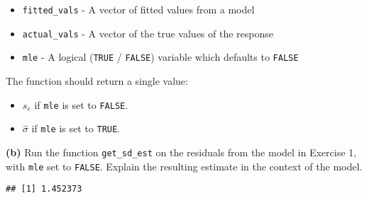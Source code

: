 \documentclass[]{article}
\newenvironment{Shaded}{\begin{snugshade}}{\end{snugshade}}
\newcommand{\ControlFlowTok}[1]{\textcolor[rgb]{0.13,0.29,0.53}{\textbf{#1}}}
\newcommand{\DataTypeTok}[1]{\textcolor[rgb]{0.13,0.29,0.53}{#1}}
\newcommand{\KeywordTok}[1]{\textcolor[rgb]{0.13,0.29,0.53}{\textbf{#1}}}
\newcommand{\NormalTok}[1]{#1}
\newcommand{\OperatorTok}[1]{\textcolor[rgb]{0.81,0.36,0.00}{\textbf{#1}}}
\newcommand{\OtherTok}[1]{\textcolor[rgb]{0.56,0.35,0.01}{#1}}
\newcommand{\StringTok}[1]{\textcolor[rgb]{0.31,0.60,0.02}{#1}}
\providecommand{\tightlist}{%
  \setlength{\itemsep}{0pt}\setlength{\parskip}{0pt}}
\begin{document}
\begin{itemize}
\tightlist
\item
  \texttt{fitted\_vals} - A vector of fitted values from a model
\item
  \texttt{actual\_vals} - A vector of the true values of the response
\item
  \texttt{mle} - A logical (\texttt{TRUE} / \texttt{FALSE}) variable
  which defaults to \texttt{FALSE}
\end{itemize}

The function should return a single value:

\begin{itemize}
\tightlist
\item
  \(s_e\) if \texttt{mle} is set to \texttt{FALSE}.
\item
  \(\hat{\sigma}\) if \texttt{mle} is set to \texttt{TRUE}.
\end{itemize}

\begin{Shaded}
\end{Shaded}

\textbf{(b)} Run the function \texttt{get\_sd\_est} on the residuals
from the model in Exercise 1, with \texttt{mle} set to \texttt{FALSE}.
Explain the resulting estimate in the context of the model.

\begin{Shaded}
\end{Shaded}

\begin{verbatim}
## [1] 1.452373
\end{verbatim}
\end{document}
